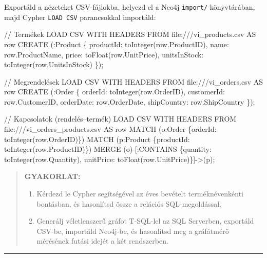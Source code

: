 \documentclass[
  magyar,
]{article}
\newenvironment{Shaded}{}{}
\newcommand{\NormalTok}[1]{#1}
\providecommand{\tightlist}{%
  \setlength{\itemsep}{0pt}\setlength{\parskip}{0pt}}
\begin{document}
Exportáld a nézeteket CSV-fájlokba, helyezd el a Neo4j \texttt{import/}
könyvtárában, majd Cypher \texttt{LOAD\ CSV} parancsokkal importáld:

\begin{Shaded}
\begin{Highlighting}[]
\NormalTok{// Termékek}
\NormalTok{LOAD CSV WITH HEADERS FROM \textquotesingle{}file:///vi\_products.csv\textquotesingle{} AS row}
\NormalTok{CREATE (:Product \{}
\NormalTok{ productId: toInteger(row.ProductID),}
\NormalTok{ name: row.ProductName,}
\NormalTok{ price: toFloat(row.UnitPrice),}
\NormalTok{ unitsInStock: toInteger(row.UnitsInStock)}
\NormalTok{\});}

\NormalTok{// Megrendelések}
\NormalTok{LOAD CSV WITH HEADERS FROM \textquotesingle{}file:///vi\_orders.csv\textquotesingle{} AS row}
\NormalTok{CREATE (:Order \{}
\NormalTok{ orderId: toInteger(row.OrderID),}
\NormalTok{ customerId: row.CustomerID,}
\NormalTok{ orderDate: row.OrderDate,}
\NormalTok{ shipCountry: row.ShipCountry}
\NormalTok{\});}

\NormalTok{// Kapcsolatok (rendelés–termék)}
\NormalTok{LOAD CSV WITH HEADERS FROM \textquotesingle{}file:///vi\_orders\_products.csv\textquotesingle{} AS row}
\NormalTok{MATCH (o:Order \{orderId: toInteger(row.OrderID)\})}
\NormalTok{MATCH (p:Product \{productId: toInteger(row.ProductID)\})}
\NormalTok{MERGE (o){-}[:CONTAINS \{quantity: toInteger(row.Quantity), unitPrice: toFloat(row.UnitPrice)\}]{-}\textgreater{}(p);}
\end{Highlighting}
\end{Shaded}

\begin{quote}
\textbf{GYAKORLAT:}

\begin{enumerate}
\def\labelenumi{\arabic{enumi}.}
\tightlist
\item
  Kérdezd le Cypher segítségével az éves bevételt terméknévenkénti
  bontásban, és hasonlítsd össze a relációs SQL-megoldással.
\item
  Generálj véletlenszerű gráfot T-SQL-lel az SQL Serverben, exportáld
  CSV-be, importáld Neo4j-be, és hasonlítsd meg a gráfátmérő mérésének
  futási idejét a két rendszerben.
\end{enumerate}
\end{quote}

\begin{center}\rule{0.5\linewidth}{0.5pt}\end{center}
\end{document}
